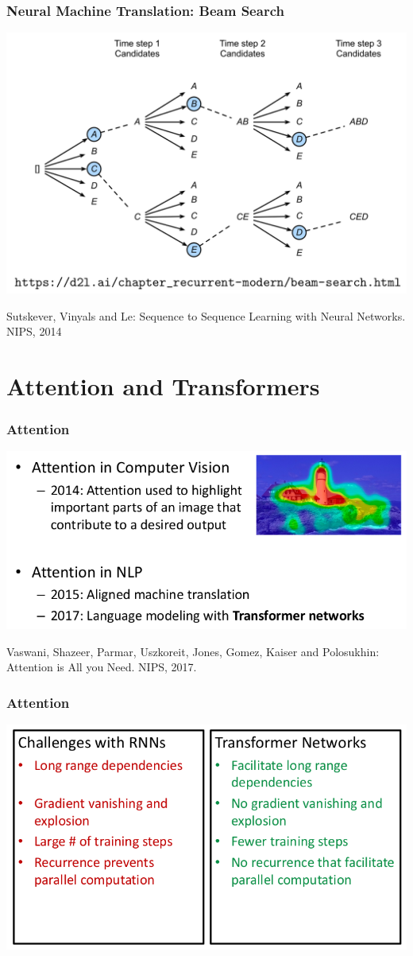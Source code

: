 \documentclass[10pt]{beamer}
\begin{document}
\begin{frame}
  \frametitle{Neural Machine Translation: Beam Search}
\begin{center}
\includegraphics[width=.7\textwidth]{images/sd}
\end{center}
\scriptsize{Sutskever, Vinyals and Le: Sequence to Sequence Learning with Neural Networks. NIPS, 2014}
\end{frame}

\section{Attention and Transformers} 

\begin{frame}
  \frametitle{Attention}
\begin{center}
\includegraphics[width=.9\textwidth]{images/p1}
\end{center}

\scriptsize{Vaswani, Shazeer, Parmar, Uszkoreit, Jones, Gomez, Kaiser and Polosukhin: Attention is All you Need. NIPS, 2017.}
\end{frame}


\begin{frame}
  \frametitle{Attention}
\begin{center}
\includegraphics[width=.8\textwidth]{images/p2}
\end{center}
\end{frame}
\end{document}
